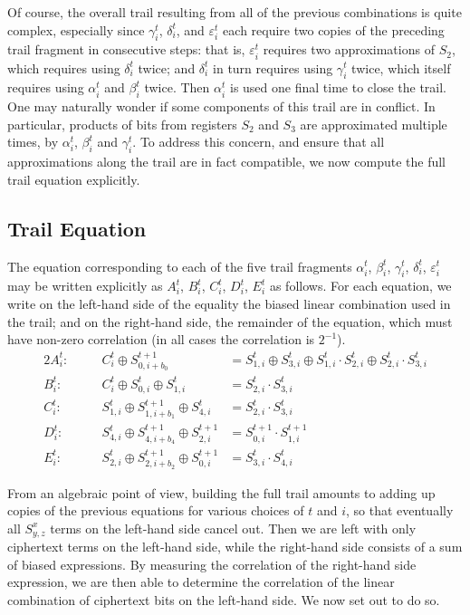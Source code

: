 Of course, the overall trail resulting from all of the previous combinations is quite complex, especially since $\gamma^t_i$, $\delta^t_i$, and $\varepsilon^t_i$ each require two copies of the preceding trail fragment in consecutive steps: that is, $\varepsilon^t_i$ requires two approximations of $S_2$, which requires using $\delta^t_i$ twice; and $\delta^t_i$ in turn requires using $\gamma^t_i$ twice, which itself requires using $\alpha^t_i$ and $\beta^t_i$ twice. Then $\alpha^t_i$ is used one final time to close the trail. One may naturally wonder if some components of this trail are in conflict. In particular, products of bits from registers $S_2$ and $S_3$ are approximated multiple times, by $\alpha^t_i$, $\beta^t_i$ and $\gamma^t_i$. To address this concern, and ensure that all approximations along the trail are in fact compatible, we now compute the full trail equation explicitly.

\subsection{Trail Equation}
\label{sec:minitraileq}

The equation corresponding to each of the five trail fragments $\alpha^t_i$, $\beta^t_i$, $\gamma^t_i$, $\delta^t_i$, $\varepsilon^t_i$ may be written explicitly as $A^t_i$, $B^t_i$, $C^t_i$, $D^t_i$, $E^t_i$ as follows. For each equation, we write on the left-hand side of the equality the biased linear combination used in the trail; and on the right-hand side, the remainder of the equation, which must have non-zero correlation (in all cases the correlation is $2^{-1}$).
\begin{alignat*}{2}
A^t_i:\quad&& C^t_i \oplus S^{t+1}_{0,i+b_0} &= S^t_{1,i} \oplus S^t_{3,i} \oplus S^t_{1,i} \cdot S^t_{2,i} \oplus S^t_{2,i} \cdot S^t_{3,i}\\
B^t_i:\quad&& C^t_i \oplus S^t_{0,i} \oplus S^t_{1,i} &= S^t_{2,i} \cdot S^t_{3,i} \\
C^t_i:\quad&& S^t_{1,i} \oplus S^{t+1}_{1,i+b_1} \oplus S^t_{4,i} &= S^t_{2,i} \cdot S^t_{3,i}\\
D^t_i:\quad&& S^t_{4,i} \oplus S^{t+1}_{4,i+b_4} \oplus S^{t+1}_{2,i} &= S^{t+1}_{0,i} \cdot S^{t+1}_{1,i}\\
E^t_i:\quad&& S^t_{2,i} \oplus S^{t+1}_{2,i+b_2} \oplus S^{t+1}_{0,i} &= S^t_{3,i} \cdot S^t_{4,i}
\end{alignat*}

From an algebraic point of view, building the full trail amounts to adding up copies of the previous equations for various choices of $t$ and $i$, so that eventually all $S^x_{y,z}$ terms on the left-hand side cancel out. Then we are left with only ciphertext terms on the left-hand side, while the right-hand side consists of a sum of biased expressions. By measuring the correlation of the right-hand side expression, we are then able to determine the correlation of the linear combination of ciphertext bits on the left-hand side. We now set out to do so.

